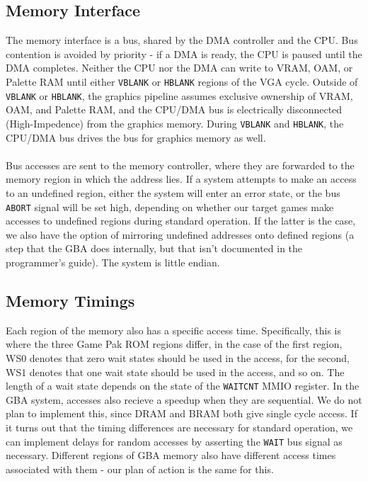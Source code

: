 \documentclass[11pt,a4paper,draft]{article}
\begin{document}
	\subsection{Memory Interface}
	The memory interface is a bus, shared by the DMA controller and the CPU. Bus contention is avoided by priority - if a DMA is ready, the CPU is paused until the DMA completes. Neither the CPU nor the DMA can write to VRAM, OAM, or Palette RAM until either \texttt{VBLANK} or \texttt{HBLANK} regions of the VGA cycle. Outside of \texttt{VBLANK} or \texttt{HBLANK}, the graphics pipeline assumes exclusive ownership of VRAM, OAM, and Palette RAM, and the CPU/DMA bus is electrically disconnected (High-Impedence) from the graphics memory. During \texttt{VBLANK} and \texttt{HBLANK}, the CPU/DMA bus drives the bus for graphics memory as well.\\\\
	Bus accesses are sent to the memory controller, where they are forwarded to the memory region in which the address lies. If a system attempts to make an access to an undefined region, either the system will enter an error state, or the bus \texttt{ABORT} signal will be set high, depending on whether our target games make accesses to undefined regions during standard operation. If the latter is the case, we also have the option of mirroring undefined addresses onto defined regions (a step that the GBA does internally, but that isn't documented in the programmer's guide). The system is little endian.\\
	
	\subsection{Memory Timings}
	Each region of the memory also has a specific access time. Specifically, this is where the three Game Pak ROM regions differ, in the case of the first region, WS0 denotes that zero wait states should be used in the access, for the second, WS1 denotes that one wait state should be used in the access, and so on. The length of a wait state depends on the state of the \texttt{WAITCNT} MMIO register. In the GBA system, accesses also recieve a speedup when they are sequential. We do not plan to implement this, since DRAM and BRAM both give single cycle access. If it turns out that the timing differences are necessary for standard operation, we can implement delays for random accesses by asserting the \texttt{WAIT} bus signal as necessary. Different regions of GBA memory also have different access times associated with them - our plan of action is the same for this.\\\\
	
\end{document}
